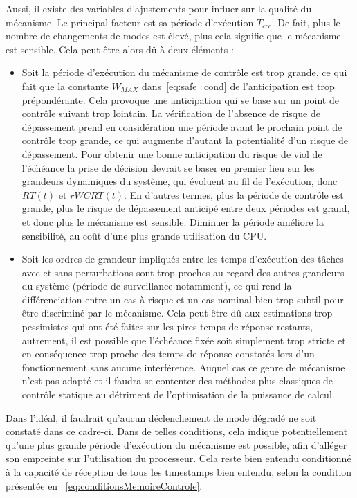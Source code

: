 \documentclass[french, a4paper, 11pt, twoside, pdftex]{StyleThese}
\begin{document}
    	Aussi, il existe des variables d'ajustements pour influer sur la qualité du mécanisme. Le principal facteur est sa période d'exécution $T_{ccc}$. De fait, plus le nombre de changements de modes est élevé, plus cela signifie que le mécanisme est sensible. Cela peut être alors dû à deux éléments : 
    	\begin{itemize}
    		\item Soit la période d'exécution du mécanisme de contrôle est trop grande, ce qui fait que la constante $W_{MAX}$ dans~\autoref{eq:safe_cond} de l'anticipation est trop prépondérante. Cela provoque une anticipation qui se base sur un point de contrôle suivant trop lointain. La vérification de l'absence de risque de dépassement prend en considération une période avant le prochain point de contrôle trop grande, ce qui augmente d'autant la potentialité d'un risque de dépassement. Pour obtenir une bonne anticipation du risque de viol de l'échéance la prise de décision devrait se baser en premier lieu sur les grandeurs dynamiques du système, qui évoluent au fil de l'exécution, donc $RT(t)$ et $rWCRT(t)$. En d'autres termes, plus la période de contrôle est grande, plus le risque de dépassement anticipé entre deux périodes est grand, et donc plus le mécanisme est sensible. Diminuer la période améliore la sensibilité, au coût d'une plus grande utilisation du CPU.
    		\item Soit les ordres de grandeur impliqués entre les temps d'exécution des tâches avec et sans perturbations sont trop proches au regard des autres grandeurs du système (période de surveillance notamment), ce qui rend la différenciation entre un cas à risque et un cas nominal bien trop subtil pour être discriminé par le mécanisme. Cela peut être dû aux estimations trop pessimistes qui ont été faites sur les pires temps de réponse restants, autrement, il est possible que l'échéance fixée soit simplement trop stricte et en conséquence trop proche des temps de réponse constatés lors d'un fonctionnement sans aucune interférence. Auquel cas ce genre de mécanisme n'est pas adapté et il faudra se contenter des méthodes plus classiques de contrôle statique au détriment de l'optimisation de la puissance de calcul.
    	\end{itemize}
    	Dans l'idéal, il faudrait qu'aucun déclenchement de mode dégradé ne soit constaté dans ce cadre-ci. Dans de telles conditions, cela indique potentiellement qu'une plus grande période d'exécution du mécanisme est possible, afin d'alléger son empreinte sur l'utilisation du processeur. Cela reste bien entendu conditionné à la capacité de réception de tous les timestamps bien entendu, selon la condition présentée en ~\autoref{eq:conditionsMemoireControle}.
    	
\end{document}

